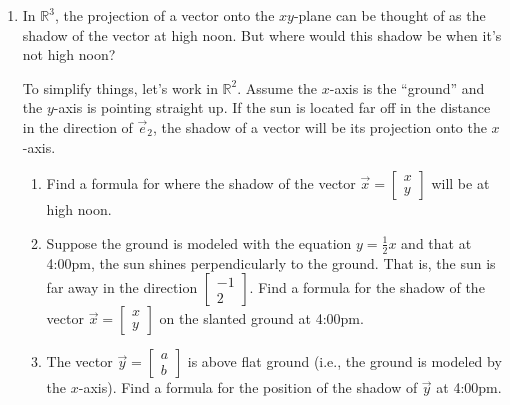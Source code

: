 \documentclass[red]{tutorial}
\newcommand{\R}{\mathbb{R}}
\newcommand{\mat}[1]{\begin{bmatrix}#1\end{bmatrix}}
\theoremstyle{definition}
\theoremstyle{theorem}
\begin{document}
\begin{tutorial}
\begin{enumerate}
	\item In $\R^3$, the projection of a vector onto the $xy$-plane can be thought of as the shadow
		of the vector at high noon. But where would this shadow be when it's not high noon?\

		To simplify things, let's work in $\R^2$. Assume the $x$-axis is the ``ground'' and the $y$-axis is
		pointing straight up. If the sun is located far off in the distance in the direction of $\vec e_2$,
		the shadow of a vector will be its projection onto the $x$-axis.
		\begin{enumerate}
			\item Find a formula for where the shadow of the vector $\vec x=\mat{x\\y}$ will be at high noon.
			\item Suppose the ground is modeled with the equation $y=\tfrac{1}{2}x$ and that at 4:00pm, the sun shines
				perpendicularly to the ground. That is, the sun is far away in the direction $\mat{-1\\2}$.
				Find a formula for the shadow of the vector $\vec x=\mat{x\\y}$ on the slanted ground at 4:00pm.
			\item The vector $\vec y=\mat{a\\b}$ is above flat ground (i.e., the ground is modeled by the $x$-axis).
				Find a formula for the position of the shadow of $\vec y$ at 4:00pm.
		\end{enumerate}

\end{enumerate}
	\end{tutorial}
\end{document}
